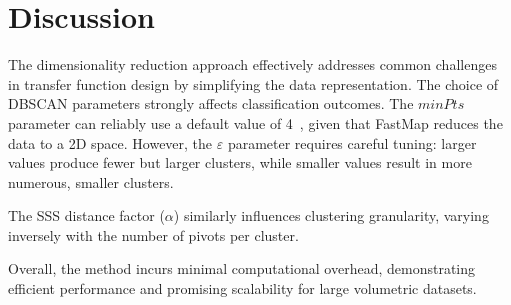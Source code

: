 \section{Discussion}
\label{sect:discussion}

The dimensionality reduction approach effectively addresses common challenges in transfer function design by simplifying the data representation. The choice of DBSCAN parameters strongly affects classification outcomes. The $minPts$ parameter can reliably use a default value of 4~\cite{ester1996}, given that FastMap reduces the data to a 2D space. However, the $\varepsilon$ parameter requires careful tuning: larger values produce fewer but larger clusters, while smaller values result in more numerous, smaller clusters.

The SSS distance factor ($\alpha$) similarly influences clustering granularity, varying inversely with the number of pivots per cluster.

Overall, the method incurs minimal computational overhead, demonstrating efficient performance and promising scalability for large volumetric datasets.
